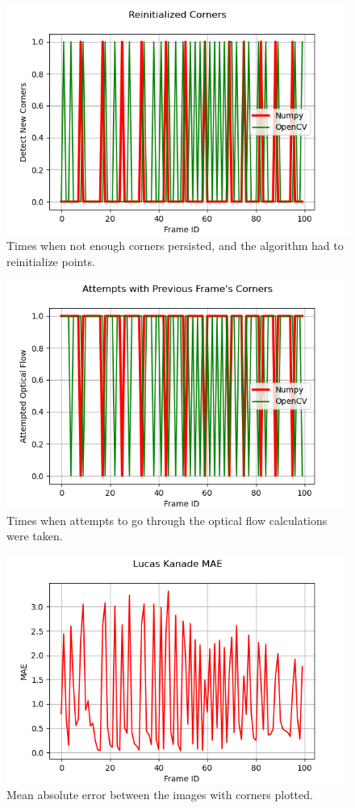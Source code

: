 \documentclass[11pt, conference, letterpaper]{IEEEtran}
\begin{document}
\begin{figure}[t]
    \centering
    \includegraphics[width=0.9\linewidth]{images/reinits.png}
    \caption{Times when not enough corners persisted, and the algorithm had to reinitialize points.}
    \label{fig:lk-reinits}
\end{figure}

\begin{figure}[t]
    \centering
    \includegraphics[width=0.9\linewidth]{images/attempts.png}
    \caption{Times when attempts to go through the optical flow calculations were taken.}
    \label{fig:lk-attempts}
\end{figure}

\begin{figure}[t]
    \centering
    \includegraphics[width=0.9\linewidth]{images/lk_mae.png}
    \caption{Mean absolute error between the images with corners plotted.}
    \label{fig:lk-mae}
\end{figure}
\end{document}
